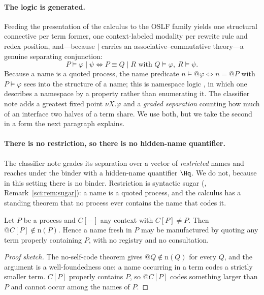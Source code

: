 \paragraph{The logic is generated.} Feeding the presentation of the \rh{}
calculus to the OSLF family yields one structural connective per term former,
one context-labeled modality per rewrite rule and redex position, and---because
$\mid$ carries an associative--commutative theory---a genuine separating
conjunction:
\[
P \models \varphi \mid \psi \iff P \equiv Q \mid R \text{ with } Q \models
\varphi,\ R \models \psi .
\]
Because a name is a quoted process, the name predicate $n \models @\varphi \iff
n = @P$ with $P \models \varphi$ sees into the structure of a name; this is
namespace logic \cite{NamespaceLogic}, in which one describes a namespace by a property
rather than enumerating it. The classifier note \cite{ClassifierNote} adds a
greatest fixed point $\nu X.\varphi$ and a \emph{graded separation} counting how
much of an interface two halves of a term share. We use both, but we take the
second in a form the next paragraph explains.

\paragraph{There is no restriction, so there is no hidden-name quantifier.}
The classifier note grades its separation over a vector of \emph{restricted}
names and reaches under the binder with a hidden-name quantifier $\Hq$. We do
not, because in this setting there is no binder. Restriction is syntactic sugar
(\chSci, Remark~\ref{sci:rem:sugar}): a name is a quoted process, and the calculus has a
standing theorem that no process ever contains the name that codes it.

\begin{proposition}\label{gam:prop:fresh}
Let $P$ be a process and $C[-]$ any context with $C[P] \neq P$. Then
$@C[P] \notin \mathrm{n}(P)$. Hence a name fresh in $P$ may be manufactured by
quoting any term properly containing $P$, with no registry and no consultation.
\end{proposition}
\begin{proof}[Proof sketch]
The no-self-code theorem gives $@Q \notin \mathrm{n}(Q)$ for every $Q$, and the
argument is a well-foundedness one: a name occurring in a term codes a strictly
smaller term. $C[P]$ properly contains $P$, so $@C[P]$ codes something larger
than $P$ and cannot occur among the names of $P$.
\end{proof}


